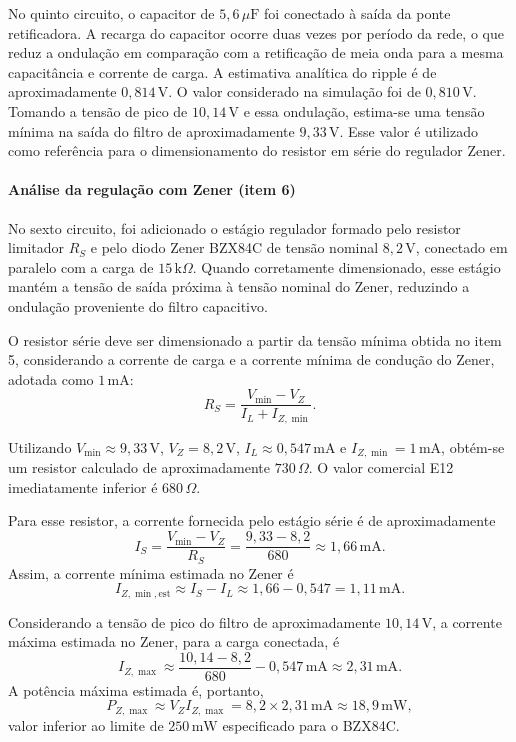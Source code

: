 \documentclass[11pt,a4paper]{article}
\begin{document}
No quinto circuito, o capacitor de $5{,}6\,\mu\text{F}$ foi conectado à saída da ponte retificadora. A recarga do capacitor ocorre duas vezes por período da rede, o que reduz a ondulação em comparação com a retificação de meia onda para a mesma capacitância e corrente de carga. A estimativa analítica do ripple é de aproximadamente $0{,}814\,\text{V}$. O valor considerado na simulação foi de $0{,}810\,\text{V}$. Tomando a tensão de pico de $10{,}14\,\text{V}$ e essa ondulação, estima-se uma tensão mínima na saída do filtro de aproximadamente $9{,}33\,\text{V}$. Esse valor é utilizado como referência para o dimensionamento do resistor em série do regulador Zener.

\paragraph{Análise da regulação com Zener (item 6)}

No sexto circuito, foi adicionado o estágio regulador formado pelo resistor limitador $R_S$ e pelo diodo Zener BZX84C de tensão nominal $8{,}2\,\text{V}$, conectado em paralelo com a carga de $15\,\text{k}\Omega$. Quando corretamente dimensionado, esse estágio mantém a tensão de saída próxima à tensão nominal do Zener, reduzindo a ondulação proveniente do filtro capacitivo.

O resistor série deve ser dimensionado a partir da tensão mínima obtida no item 5, considerando a corrente de carga e a corrente mínima de condução do Zener, adotada como $1\,\text{mA}$:
\[
R_S=\frac{V_{\min}-V_Z}{I_L+I_{Z,\min}}.
\]

Utilizando $V_{\min}\approx9{,}33\,\text{V}$, $V_Z=8{,}2\,\text{V}$, $I_L\approx0{,}547\,\text{mA}$ e $I_{Z,\min}=1\,\text{mA}$, obtém-se um resistor calculado de aproximadamente $730\,\Omega$. O valor comercial E12 imediatamente inferior é $680\,\Omega$.

Para esse resistor, a corrente fornecida pelo estágio série é de aproximadamente
\[
I_S=\frac{V_{\min}-V_Z}{R_S}
=\frac{9{,}33-8{,}2}{680}
\approx1{,}66\,\text{mA}.
\]
Assim, a corrente mínima estimada no Zener é
\[
I_{Z,\min,\mathrm{est}}\approx I_S-I_L
\approx1{,}66-0{,}547
=1{,}11\,\text{mA}.
\]

Considerando a tensão de pico do filtro de aproximadamente $10{,}14\,\text{V}$, a corrente máxima estimada no Zener, para a carga conectada, é
\[
I_{Z,\max}\approx
\frac{10{,}14-8{,}2}{680}-0{,}547\,\text{mA}
\approx2{,}31\,\text{mA}.
\]
A potência máxima estimada é, portanto,
\[
P_{Z,\max}\approx V_Z I_{Z,\max}
=8{,}2\times2{,}31\,\text{mA}
\approx18{,}9\,\text{mW},
\]
valor inferior ao limite de $250\,\text{mW}$ especificado para o BZX84C.
\end{document}
